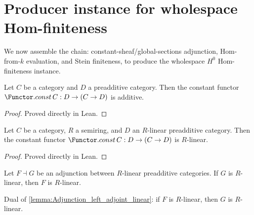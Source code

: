 \section{Producer instance for wholespace Hom-finiteness}
\label{sec:IsHModuleHomFinite_producer}

We now assemble the chain: constant-sheaf/global-sections adjunction, Hom-from-\(k\) evaluation, and Stein finiteness, to produce the wholespace \(H^0\) Hom-finiteness instance.

\begin{lemma}

  \label{lem:Functor_const_additive}
  Let \(C\) be a category and \(D\) a preadditive category. Then the constant functor
  \(\Functor.const\, C : D \to (C \to D)\) is additive.
\end{lemma}

\begin{proof}

\leanok
  Proved directly in Lean.
\end{proof}

\begin{lemma}

  \label{lem:Functor_const_linear}
  Let \(C\) be a category, \(R\) a semiring, and \(D\) an \(R\)-linear preadditive category.
  Then the constant functor \(\Functor.const\, C : D \to (C \to D)\) is \(R\)-linear.
\end{lemma}

\begin{proof}

\leanok
  Proved directly in Lean.
\end{proof}

\begin{lemma}
  \label{lemma:Adjunction_left_adjoint_linear}
  Let \(F \dashv G\) be an adjunction between \(R\)-linear preadditive categories. If \(G\) is \(R\)-linear, then \(F\) is \(R\)-linear.
\end{lemma}

\begin{lemma}
  \label{lemma:Adjunction_right_adjoint_linear}
  Dual of \cref{lemma:Adjunction_left_adjoint_linear}: if \(F\) is \(R\)-linear, then \(G\) is \(R\)-linear.
\end{lemma}

